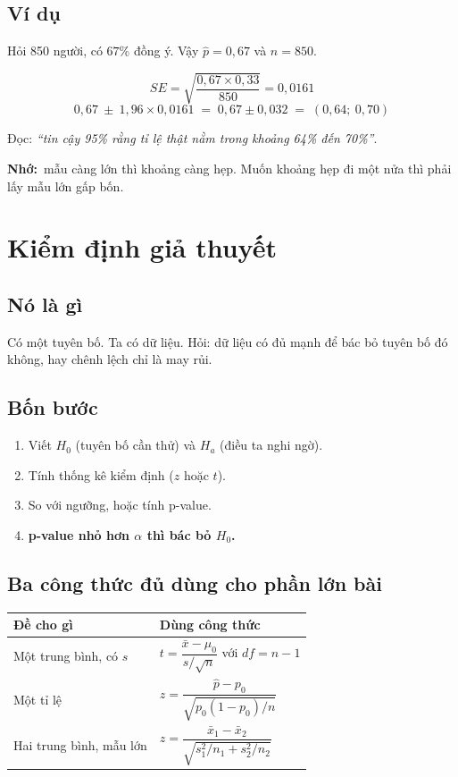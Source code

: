 \documentclass[12pt]{article}
\newcommand{\nho}{\textbf{Nhớ:}\ }
\begin{document}
\subsection*{Ví dụ}

Hỏi 850 người, có $67\%$ đồng ý. Vậy $\hat p = 0{,}67$ và $n = 850$.

\[
SE = \sqrt{\frac{0{,}67 \times 0{,}33}{850}} = 0{,}0161
\]
\[
0{,}67 \ \pm\ 1{,}96 \times 0{,}0161
\;=\; 0{,}67 \pm 0{,}032
\;=\; (0{,}64;\ 0{,}70)
\]

Đọc: \emph{``tin cậy 95\% rằng tỉ lệ thật nằm trong khoảng 64\% đến 70\%''}.

\nho mẫu càng lớn thì khoảng càng hẹp. Muốn khoảng hẹp đi một nửa thì phải lấy mẫu
lớn gấp bốn.

\section{Kiểm định giả thuyết}

\subsection*{Nó là gì}

Có một tuyên bố. Ta có dữ liệu. Hỏi: dữ liệu có đủ mạnh để bác bỏ tuyên bố đó không,
hay chênh lệch chỉ là may rủi.

\subsection*{Bốn bước}

\begin{enumerate}
\item Viết $H_0$ (tuyên bố cần thử) và $H_a$ (điều ta nghi ngờ).
\item Tính thống kê kiểm định ($z$ hoặc $t$).
\item So với ngưỡng, hoặc tính p-value.
\item \textbf{p-value nhỏ hơn $\alpha$ thì bác bỏ $H_0$.}
\end{enumerate}

\subsection*{Ba công thức đủ dùng cho phần lớn bài}

\begin{center}
\begin{tabular}{@{}ll@{}}
\toprule
\textbf{Đề cho gì} & \textbf{Dùng công thức} \\
\midrule
Một trung bình, có $s$ &
  $t = \dfrac{\bar x - \mu_0}{s/\sqrt n}$ \quad với $df = n-1$ \\[10pt]
Một tỉ lệ &
  $z = \dfrac{\hat p - p_0}{\sqrt{p_0(1-p_0)/n}}$ \\[10pt]
Hai trung bình, mẫu lớn &
  $z = \dfrac{\bar x_1 - \bar x_2}{\sqrt{s_1^2/n_1 + s_2^2/n_2}}$ \\
\bottomrule
\end{tabular}
\end{center}
\end{document}
